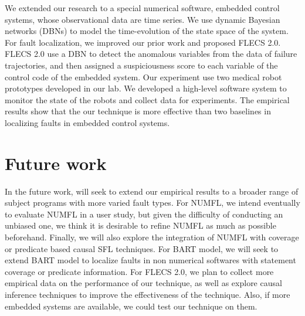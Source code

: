 We extended our research to a special numerical software, embedded control systems, whose observational data are time series. We use dynamic Bayesian networks (DBNs) to model the time-evolution of the state space of the system. For fault localization, we improved our prior work and proposed FLECS 2.0. FLECS 2.0 use a DBN to detect the anomalous variables from the data of failure trajectories, and then assigned a suspiciousness score to each variable of the control code of the embedded system. Our experiment use two medical robot prototypes developed in our lab. We developed a high-level software system to monitor the state of the robots and collect data for experiments. The empirical results show that the our technique is more effective than two baselines in localizing faults in embedded control systems.

\section{Future work}
In the future work, will seek to extend our empirical results to a broader range of subject programs with more varied fault types.  For NUMFL, we intend eventually to evaluate NUMFL in a user study, but given the difficulty of conducting an unbiased one, we think it is desirable to refine NUMFL as much as possible beforehand.  Finally, we will also explore the integration of NUMFL with coverage or predicate based causal SFL techniques. For BART model, we will seek to extend BART model to localize faults in non numerical softwares with statement coverage or predicate information. For FLECS 2.0, we plan to collect more empirical data on the performance of our technique, as well as explore causal inference techniques to improve the effectiveness of the technique. Also, if more embedded systems are available, we could test our technique on them. 











